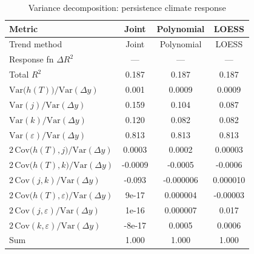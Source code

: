 \begin{table}[htbp]
\centering
\caption{Variance decomposition: persistence climate response}
\label{tab:variance_decomp_persistence}

\small
\begin{tabular}{@{}lccc@{}}
\toprule
Metric & Joint & Polynomial & LOESS \\
\midrule
Trend method & Joint & Polynomial & LOESS \\
\midrule
Response fn $\Delta R^2$ & — & — & — \\
Total $R^2$ & 0.187 & 0.187 & 0.187 \\
\midrule
$\mathrm{Var}\!\big(h(T)\big)/\mathrm{Var}(\Delta y)$ & 0.001 & 0.0009 & 0.0009 \\
$\mathrm{Var}(j)/\mathrm{Var}(\Delta y)$ & 0.159 & 0.104 & 0.087 \\
$\mathrm{Var}(k)/\mathrm{Var}(\Delta y)$ & 0.120 & 0.082 & 0.082 \\
$\mathrm{Var}(\varepsilon)/\mathrm{Var}(\Delta y)$ & 0.813 & 0.813 & 0.813 \\
\midrule
$2\,\mathrm{Cov}\!\big(h(T),j\big)/\mathrm{Var}(\Delta y)$ & 0.0003 & 0.0002 & 0.00003 \\
$2\,\mathrm{Cov}\!\big(h(T),k\big)/\mathrm{Var}(\Delta y)$ & -0.0009 & -0.0005 & -0.0006 \\
$2\,\mathrm{Cov}(j,k)/\mathrm{Var}(\Delta y)$ & -0.093 & -0.000006 & 0.000010 \\
$2\,\mathrm{Cov}\!\big(h(T),\varepsilon\big)/\mathrm{Var}(\Delta y)$ & 9e-17 & 0.000004 & -0.00003 \\
$2\,\mathrm{Cov}(j,\varepsilon)/\mathrm{Var}(\Delta y)$ & 1e-16 & 0.000007 & 0.017 \\
$2\,\mathrm{Cov}(k,\varepsilon)/\mathrm{Var}(\Delta y)$ & -8e-17 & 0.0005 & 0.0006 \\
\midrule
Sum & 1.000 & 1.000 & 1.000 \\
\bottomrule
\end{tabular}
\end{table}